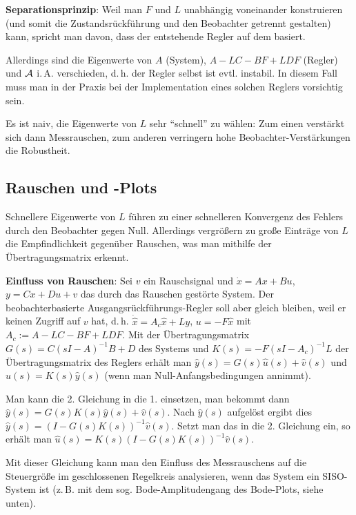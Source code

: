 \textbf{Separationsprinzip}:
Weil man $F$ und $L$ unabhängig voneinander konstruieren
(und somit die Zustandsrückführung und den Beobachter getrennt gestalten) kann,
spricht man davon, dass der entstehende Regler auf dem
 basiert.

Allerdings sind die Eigenwerte von $A$ (System), $A - LC - BF + LDF$ (Regler) und $\mathcal{A}$ i.\,A.
verschieden, d.\,h. der Regler selbst ist evtl. instabil.
In diesem Fall muss man in der Praxis bei der Implementation eines solchen Reglers vorsichtig
sein.

Es ist naiv, die Eigenwerte von $L$ sehr "`schnell"' zu wählen:
Zum einen verstärkt sich dann Messrauschen, zum anderen verringern hohe Beobachter-Verstärkungen
die Robustheit.

\pagebreak

\subsection{%
    Rauschen und -Plots%
}

Schnellere Eigenwerte von $L$ führen zu einer schnelleren Konvergenz des Fehlers durch den
Beobachter gegen Null.
Allerdings vergrößern zu große Einträge von $L$ die Empfindlichkeit gegenüber Rauschen,
was man mithilfe der Übertragungsmatrix erkennt.

\textbf{Einfluss von Rauschen}:
Sei $v$ ein Rauschsignal und $\dot{x} = Ax + Bu$, $y = Cx + Du + v$ das durch das Rauschen
gestörte System.
Der beobachterbasierte Ausgangsrückführungs-Regler soll aber gleich bleiben, weil er keinen
Zugriff auf $v$ hat, d.\,h.
$\dot{\widehat{x}} = A_c \widehat{x} + Ly$, $u = -F\widehat{x}$
mit $A_c := A - LC - BF + LDF$.
Mit der Übertragungsmatrix $G(s) = C (sI - A)^{-1} B + D$ des Systems und
$K(s) = -F(sI - A_c)^{-1} L$ der Übertragungsmatrix des Reglers erhält man
$\widehat{y}(s) = G(s) \widehat{u}(s) + \widehat{v}(s)$ und
$\widehat{u}(s) = K(s) \widehat{y}(s)$
(wenn man Null-Anfangsbedingungen annimmt).

Man kann die 2. Gleichung in die 1. einsetzen,
man bekommt dann $\widehat{y}(s) = G(s)K(s) \widehat{y}(s) + \widehat{v}(s)$.
Nach $\widehat{y}(s)$ aufgelöst ergibt dies
$\widehat{y}(s) = (I - G(s)K(s))^{-1} \widehat{v}(s)$.
Setzt man das in die 2. Gleichung ein, so erhält man
$\widehat{u}(s) = K(s) (I - G(s)K(s))^{-1} \widehat{v}(s)$.

Mit dieser Gleichung kann man den Einfluss des Messrauschens auf die Steuergröße im geschlossenen
Regelkreis analysieren, wenn das System ein SISO-System ist
(z.\,B. mit dem sog. Bode-Amplitudengang des Bode-Plots, siehe unten).

